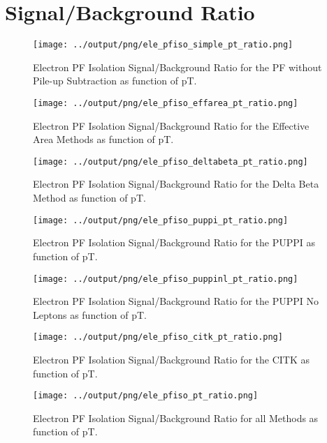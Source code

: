 \documentclass[11pt]{book}
\begin{document}
\chapter{Signal/Background Ratio}
\begin{figure}[htb]
\centering
\texttt{[image: ../output/png/ele\_pfiso\_simple\_pt\_ratio.png]}
\caption{Electron PF Isolation Signal/Background Ratio for the PF without Pile-up Subtraction as function of pT.}
\label{fig:ele_pfiso_pt_ratio_simple}
\end{figure}

\begin{figure}[htb]
\centering
\texttt{[image: ../output/png/ele\_pfiso\_effarea\_pt\_ratio.png]}
\caption{Electron PF Isolation Signal/Background Ratio for the Effective Area Methods as function of pT.}
\label{fig:ele_pfiso_pt_ratio_effarea}
\end{figure}

\begin{figure}[htb]
\centering
\texttt{[image: ../output/png/ele\_pfiso\_deltabeta\_pt\_ratio.png]}
\caption{Electron PF Isolation Signal/Background Ratio for the Delta Beta Method as function of pT.}
\label{fig:ele_pfiso_pt_ratio_deltabeta}
\end{figure}

\begin{figure}[htb]
\centering
\texttt{[image: ../output/png/ele\_pfiso\_puppi\_pt\_ratio.png]}
\caption{Electron PF Isolation Signal/Background Ratio for the PUPPI as function of pT.}
\label{fig:ele_pfiso_pt_ratio_puppi}
\end{figure}

\begin{figure}[htb]
\centering
\texttt{[image: ../output/png/ele\_pfiso\_puppinl\_pt\_ratio.png]}
\caption{Electron PF Isolation Signal/Background Ratio for the PUPPI No Leptons as function of pT.}
\label{fig:ele_pfiso_pt_ratio_puppinl}
\end{figure}

\begin{figure}[htb]
\centering
\texttt{[image: ../output/png/ele\_pfiso\_citk\_pt\_ratio.png]}
\caption{Electron PF Isolation Signal/Background Ratio for the CITK as function of pT.}
\label{fig:ele_pfiso_pt_ratio_citk}
\end{figure}


\begin{figure}[htb]
\centering
\texttt{[image: ../output/png/ele\_pfiso\_pt\_ratio.png]}
\caption{Electron PF Isolation Signal/Background Ratio for all Methods as function of pT.}
\label{fig:ele_pfiso_pt_ratio}
\end{figure}
\clearpage
\end{document}
